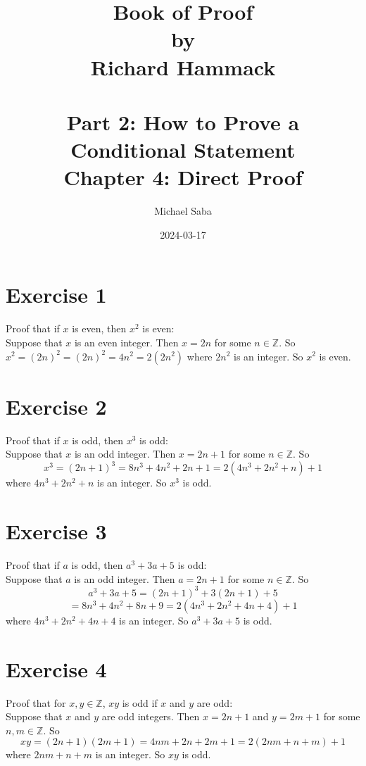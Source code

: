 \documentclass[12pt]{article}
\title{%
    \Huge Book of Proof \\
    \large by \\
    \Large Richard Hammack \\~\\
    \huge Part 2: How to Prove a Conditional Statement \\
    \LARGE Chapter 4: Direct Proof
}
\date{2024-03-17}
\author{Michael Saba}
\newcommand{\Z}{\mathbb{Z}}
\begin{document}
    \maketitle
    \newpage

    \section*{Exercise 1}
    Proof that if $x$ is even,
    then $x^2$ is even: \\
    Suppose that $x$ is an even integer.
    Then $x = 2n$ for some $n \in \Z$.
    So $x^2 = (2n)^2 = (2n)^2 = 4n^2 = 2(2n^2)$
    where $2n^2$ is an integer.
    So $x^2$ is even.

    \section*{Exercise 2}
    Proof that if $x$ is odd,
    then $x^3$ is odd: \\
    Suppose that $x$ is an odd integer.
    Then $x = 2n+1$ for some $n \in \Z$.
    So
    \[ x^3 = (2n+1)^3 = 8n^3 + 4n^2 + 2n + 1 = 2(4n^3 + 2n^2 + n) + 1 \]
    where $4n^3 + 2n^2 + n$ is an integer.
    So $x^3$ is odd. \\

    \section*{Exercise 3}
    Proof that if $a$ is odd,
    then $a^3 + 3a + 5$ is odd: \\
    Suppose that $a$ is an odd integer.
    Then $a = 2n+1$ for some $n \in \Z$.
    So 
    \[ a^3 + 3a + 5 = (2n+1)^3 + 3(2n+1) + 5 \]
    \[ = 8n^3 + 4n^2 + 8n + 9 = 2(4n^3 + 2n^2 + 4n + 4) + 1 \]
    where $4n^3 + 2n^2 + 4n + 4$ is an integer.
    So $a^3 + 3a + 5$ is odd. \\

    \section*{Exercise 4}
    Proof that for $x, y \in \Z$,
    $xy$ is odd if $x$ and $y$ are odd: \\
    Suppose that $x$ and $y$ are odd integers.
    Then $x = 2n+1$ and $y = 2m+1$ for some $n, m \in \Z$.
    So 
    \[ xy = (2n+1)(2m+1) = 4nm + 2n + 2m + 1 = 2(2nm + n + m) + 1\]
    where $2nm + n + m$ is an integer.
    So $xy$ is odd. \\
\end{document}
